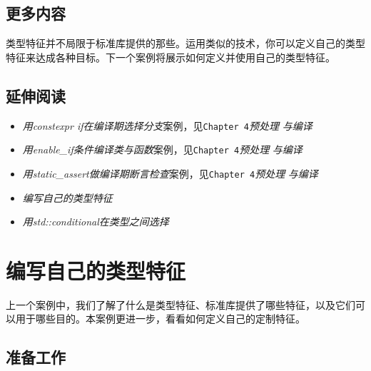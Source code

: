 
\subsection{更多内容}



类型特征并不局限于标准库提供的那些。运用类似的技术，你可以定义自己的类型特征来达成各种目标。下一个案例将展示如何定义并使用自己的类型特征。



\subsection{延伸阅读}



\begin{itemize}
\item \textit{用constexpr if在编译期选择分支}案例，见\texttt{Chapter 4}\textit{预处理} \textit{与编译}



\item \textit{用enable\_if条件编译类与函数}案例，见\texttt{Chapter 4}\textit{预处理} \textit{与编译}



\item \textit{用static\_assert做编译期断言检查}案例，见\texttt{Chapter 4}\textit{预处理} \textit{与编译}



\item \textit{编写自己的类型特征}



\item \textit{用std::conditional在类型之间选择}

\end{itemize}



\section{编写自己的类型特征}



上一个案例中，我们了解了什么是类型特征、标准库提供了哪些特征，以及它们可以用于哪些目的。本案例更进一步，看看如何定义自己的定制特征。



\subsection{准备工作}


